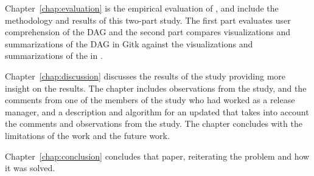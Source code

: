 Chapter~\ref{chap:evaluation} is the empirical evaluation of \tool{},
and include the methodology and results of this two-part study. The
first part evaluates user comprehension of the DAG and the second part
compares visualizations and summarizations of the DAG in Gitk against
the visualizations and summarizations of the \mt{} in \tool{}.

Chapter~\ref{chap:discussion} discusses the results of the study
providing more insight on the results. The chapter includes observations
from the study, and the comments from one of the members of the study
who had worked as a release manager, and a description and algorithm for
an updated \mt{} that takes into account the comments and observations
from the study. The chapter concludes with the limitations of the work
and the future work.

Chapter~\ref{chap:conclusion} concludes that paper, reiterating the
problem and how it was solved.
